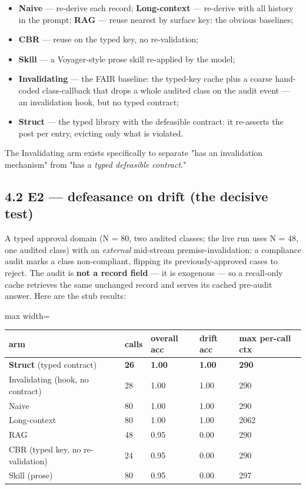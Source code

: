 \documentclass[11pt]{article}
\begin{document}
\begin{itemize}
\item \textbf{Naive} — re-derive each record; \textbf{Long-context} — re-derive with all history in the prompt; \textbf{RAG} — reuse nearest by surface key: the obvious baselines;
\item \textbf{CBR} — reuse on the typed key, no re-validation;
\item \textbf{Skill} — a Voyager-style prose skill re-applied by the model;
\item \textbf{Invalidating} — the FAIR baseline: the typed-key cache plus a coarse hand-coded class-callback that drops a whole audited class on the audit event — an invalidation hook, but no typed contract;
\item \textbf{Struct} — the typed library with the defeasible contract: it re-asserts the post per entry, evicting only what is violated.
\end{itemize}

The Invalidating arm exists specifically to separate "has an invalidation mechanism" from "has a \emph{typed defeasible contract}."

\subsection*{4.2 E2 — defeasance on drift (the decisive test)}

A typed approval domain (N = 80, two audited classes; the live run uses N = 48, one audited class) with an \emph{external} mid-stream premise-invalidation: a compliance audit marks a class non-compliant, flipping its previously-approved cases to reject. The audit is \textbf{not a record field} — it is exogenous — so a recall-only cache retrieves the same unchanged record and serves its cached pre-audit answer. Here are the stub results:

\begin{center}\small\begin{adjustbox}{max width=\linewidth}\begin{tabular}{lllll}\toprule
arm & calls & overall acc & \textbf{drift acc} & max per-call ctx \\ \midrule
\textbf{Struct} (typed contract) & \textbf{26} & \textbf{1.00} & \textbf{1.00} & \textbf{290} \\
Invalidating (hook, no contract) & 28 & 1.00 & 1.00 & 290 \\
Naive & 80 & 1.00 & 1.00 & 290 \\
Long-context & 80 & 1.00 & 1.00 & 2062 \\
RAG & 48 & 0.95 & 0.00 & 290 \\
CBR (typed key, no re-validation) & 24 & 0.95 & 0.00 & 290 \\
Skill (prose) & 80 & 0.95 & 0.00 & 297 \\
\bottomrule\end{tabular}\end{adjustbox}\end{center}
\end{document}
